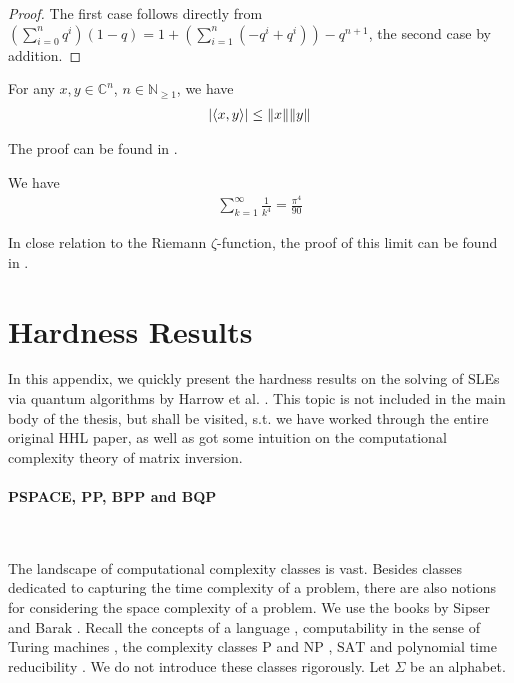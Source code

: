 \begin{proof}
    The first case follows directly from \(\left(\sum_{i=0}^n q^i\right) (1-q) = 1 + \left(\sum_{i=1}^n \left(-q^i + q^i\right)\right) - q^{n+1}\), the second case by addition.
\end{proof}

\begin{theorem} \label{cauchy_schwarz_inequality}
    For any \(x, y \in \mathbb{C}^n\), \(n \in \mathbb{N}_{\geq 1}\), we have
    \begin{align}
        |\langle x, y \rangle| \leq \norm{x}\norm{y}
    \end{align}
\end{theorem}

The proof can be found in \cite[p. 220]{Werner2018}.

\begin{theorem} \label{zeta_two}
    We have
    \begin{align}
        \sum_{k=1}^\infty \frac{1}{k^4} = \frac{\pi^4}{90}
    \end{align}
\end{theorem}

In close relation to the Riemann \(\zeta\)-function, the proof of this limit can be found in \cite[pp. 296-298]{Remmert2002}.

\newpage

\section{Hardness Results } \label{hardness_results}

In this appendix, we quickly present the hardness results on the solving of SLEs via quantum algorithms by Harrow et al. \cite[pp. 12-14]{Harrow2008}. This topic is not included in the main body of the thesis, but shall be visited, s.t. we have worked through the entire original HHL paper, as well as got some intuition on the computational complexity theory of matrix inversion.

\paragraph*{PSPACE, PP, BPP and BQP} \phantom{}\\\phantom{}

The landscape of computational complexity classes is vast. Besides classes dedicated to capturing the time complexity of a problem, there are also notions for considering the space complexity of a problem. We use the books by Sipser and Barak \cite{Sipser2013, Barak2007}. Recall the concepts of a language \cite[p. 16]{Sipser2013}, computability in the sense of Turing machines \cite[p. 168]{Sipser2013}, the complexity classes \(\text{P}\) \cite[p. 286]{Sipser2013} and \(\text{NP}\) \cite[pp. 293-294]{Sipser2013}, \(\text{SAT}\) \cite[p. 299]{Sipser2013} and polynomial time reducibility \cite[p. 300]{Sipser2013}. We do not introduce these classes rigorously. Let \(\Sigma\) be an alphabet.

